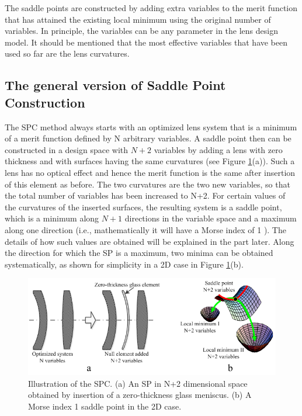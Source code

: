 The saddle points are constructed by adding extra variables to the merit function that has attained the existing local minimum using the original number of variables. In principle, the variables can be any parameter in the lens design model. It should be mentioned that the most effective variables that have been used so far are the lens curvatures. 

\subsection{The general version of Saddle Point Construction \label{spc-general}}
\label{SPC_general}
The SPC method always starts with an optimized lens system that is a minimum of a merit function defined by N arbitrary variables. A saddle point then can be constructed in a design space with $N + 2$ variables by adding a lens with zero thickness and with surfaces having the same curvatures (see Figure \ref{fig:SPCdemo}(a)). Such a lens has no optical effect and hence the merit function is the same after insertion of this element as before. The two curvatures are the two new variables, so that the total number of variables has been increased to N+2. For certain values of the curvatures of the inserted surfaces, the resulting system is a saddle point, which is a minimum along $N + 1$ directions in the variable space and a maximum along one direction (i.e., mathematically it will have a Morse index of 1 \cite{MVTurnhoutSPC15}). The details of how such values are obtained will be explained in the part later. Along the direction for which the SP is a maximum, two minima can be obtained systematically, as shown for simplicity in a 2D case in Figure \ref{fig:SPCdemo}(b).

\begin{figure}[h!]
    \centering
    \includegraphics[scale=0.68]{chapter-2/figures/FigSPCDemo.png}
    \caption{Illustration of the SPC. (a) An SP in N+2 dimensional space obtained by insertion of a zero-thickness glass meniscus. (b) A Morse index 1 saddle point in the 2D case.}
    \label{fig:SPCdemo}
\end{figure}

